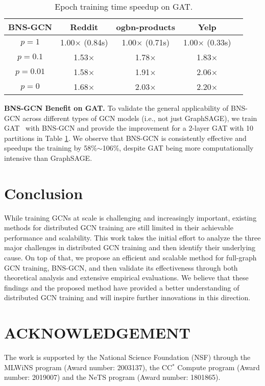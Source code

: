 \documentclass{article}
\newcommand{\niparagraph}[1]{\noindent\textbf{#1}}
\begin{document}
\begin{table}[t]
\setlength{\tabcolsep}{0.25em}
    \centering
    \caption{Epoch training time speedup on GAT.}
    \begin{tabular}{c|cccc}
        \hline
        BNS-GCN   & Reddit    & ogbn-products	& Yelp \\
        \hline
        $p=1$     & 1.00$\times$ (0.84s)	    & 1.00$\times$ (0.71s)         & 1.00$\times$ (0.33s) \\
        $p=0.1$	  & 1.53$\times$              & 1.78$\times$                 & 1.83$\times$ \\
        $p=0.01$  & 1.58$\times$	            & 1.91$\times$                 & 2.06$\times$ \\
        $p=0$     & 1.68$\times$              & 2.03$\times$                 & 2.20$\times$ \\
        \hline
    \end{tabular}
    \label{tab:gat}
\end{table}
\niparagraph{BNS-GCN Benefit on GAT.}
To validate the general applicability of BNS-GCN across different types of GCN models (i.e., not just GraphSAGE), we train GAT~\citep{velivckovic2017graph} with BNS-GCN and provide the improvement for a 2-layer GAT with 10 partitions in Table \ref{tab:gat}. 
We observe that BNS-GCN is consistently effective and speedups the training by 58\%$\sim$106\%, despite GAT being more computationally intensive than GraphSAGE.
 \section{Conclusion}
While training GCNs at scale is challenging and increasingly important, 
existing methods for distributed GCN training are still limited in their achievable performance and scalability. 
This work takes the initial effort to analyze the three major challenges in distributed GCN training and then identify their underlying cause. On top of that, we propose an efficient and scalable method  for full-graph GCN training, BNS-GCN, and then validate its effectiveness through both theoretical analysis and extensive empirical evaluations.  
We believe that these findings and the proposed method have provided a better understanding of distributed GCN training and will inspire further innovations in this direction. 
 
\section*{ACKNOWLEDGEMENT}
The work is supported by the National Science Foundation (NSF) through the MLWiNS program (Award number: 2003137), the CC$^*$ Compute program (Award number: 2019007) and the NeTS program (Award number: 1801865).
\end{document}
